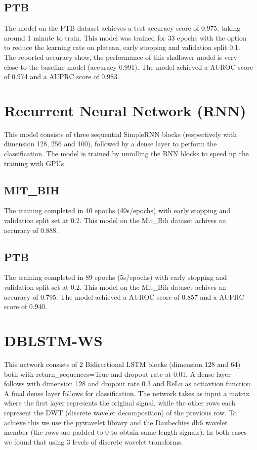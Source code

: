 \documentclass[11pt]{scrartcl}
\begin{document}
\subsection{PTB}
The model on the PTB dataset achieves a test accuracy score of 0.975, taking around 1 minute to train. This model was trained for 33 epochs with the option to reduce the learning rate on plateau, early stopping and validation split 0.1.
The reported accuracy show, the performance of this shallower model is very close to the baseline model (accuracy 0.991). The model achieved a AUROC score of 0.974 and a AUPRC score of 0.983.

\section{Recurrent Neural Network (RNN)}
This model consists of three sequential SimpleRNN blocks (respectively with dimension 128, 256 and 100), followed by a dense layer to perform the classification. The model is trained by unrolling the RNN blocks to speed up the training with GPUs.
\subsection{MIT\_BIH}
The training completed in 40 epochs (40s/epochs) with early stopping and validation split set at 0.2.
This model on the Mit\_Bih dataset achives an accuracy of 0.888. 

\subsection{PTB}
 The training completed in 89 epochs (5s/epochs) with early stopping and validation split set at 0.2.
This model on the Mit\_Bih dataset achives an accuracy of 0.795. The model achieved a AUROC score of 0.857 and a AUPRC score of 0.940.

\section{DBLSTM-WS}
This network consists of 2 Bidirectional LSTM blocks (dimension 128 and 64) both with return\_sequences=True and dropout rate at 0.01. A dense layer follows with dimension 128 and dropout rate 0.3 and ReLu as actiavtion function. A final dense layer follows for classification. The network takes as input a matrix where the first layer represents the original signal, while the other rows each represent the DWT (discrete wavelet decomposition) of the previous row. To achieve this we use the pywavelet library and the Daubechies db6 wavelet member (the rows are padded to 0 to obtain same-length signals). In both cases we found that using 3 levels of discrete wavelet transforms.
\end{document}
